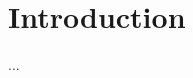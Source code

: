 \renewcommand{\partname}{}
\renewcommand{\chaptername}{}
\renewcommand{\thechapter}{}
\renewcommand{\thesection}{}



\chapter{Introduction}

...
\lipsum

